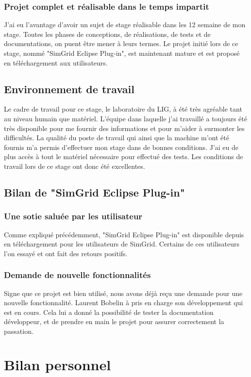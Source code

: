 \documentclass{article}
\begin{document}
        \subsubsection{Projet complet et réalisable dans le temps impartit}
       	J'ai eu l'avantage d'avoir un sujet de stage réalisable dans les 12 semaine de mon stage. Toutes les phases de conceptions, de réalisations, de tests et de documentations, on puent être mener à leurs termes. Le projet initié lors de ce stage, nommé "SimGrid Eclipse Plug-in", est maintenant mature et est proposé en téléchargement aux utilisateurs.
    \subsection{Environnement de travail}
    Le cadre de travail pour ce stage, le laboratoire du LIG, à été très agréable tant au niveau humain que matériel. L'équipe dans laquelle j'ai travaillé a toujours été très disponible pour me fournir des informations et pour m'aider à surmonter les difficultés. La qualité du poste de travail qui ainsi que la machine m'ont été fournis m'a permis d'effectuer mon stage dans de bonnes conditions. J'ai eu de plus accès à tout le matériel nécessaire pour effectué des tests. Les conditions de travail lors de ce stage ont donc été excellentes.
  	\subsection{Bilan de "SimGrid Eclipse Plug-in"}
        \subsubsection{Une sotie saluée par les utilisateur}
        Comme expliqué précédemment, "SimGrid Eclipse Plug-in" est disponible depuis en téléchargement pour les utilisateurs de SimGrid. Certains de ces utilisateurs l'on essayé et ont fait des retours positifs.
        \subsubsection{Demande de nouvelle fonctionnalités}
        Signe que ce projet est bien utilisé, nous avons déjà reçu une demande pour une nouvelle fonctionnalité. Laurent Bobelin à pris en charge son développement qui est en cours. Cela lui a donné la possibilité de tester la documentation développeur, et de prendre en main le projet pour assurer correctement la passation.
        
\section{Bilan personnel}
\end{document}
